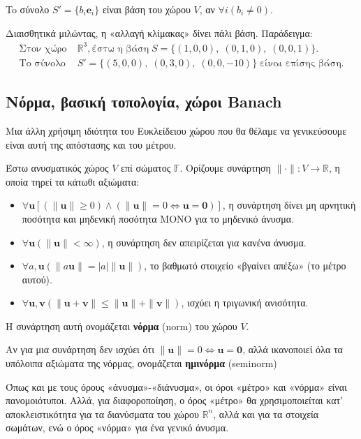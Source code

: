 \documentclass[main.tex]{subfiles}
\begin{document}
	\begin{corollary}
		To σύνολο ${S' = \{b_i\boldsymbol{e}_i\}}$ είναι βάση του χώρου $V$, αν ${\forall i(b_i \neq 0)}$.
	\end{corollary}
	Διαισθητικά μιλώντας, η «αλλαγή κλίμακας» δίνει πάλι βάση. Παράδειγμα:
	\begin{align*}
		\text{Στον χώρο}\;&\mathbb{R}^3, \text{έστω η βάση} \; S = \{(1,0,0),\; (0,1,0),\; (0,0,1)\}. \\
		\text{To σύνολο}\; &S'=\{(5, 0, 0),\;(0,3,0),\;(0,0,-10)\} \; \text{είναι επίσης βάση.}
	\end{align*}
	\newpage
	\subsection{Νόρμα, βασική τοπολογία, χώροι Banach}
	
	Μια άλλη χρήσιμη ιδιότητα του Ευκλείδειου χώρου που θα θέλαμε να γενικεύσουμε είναι αυτή της απόστασης και του μέτρου.
	
	\begin{definition}
		Έστω ανυσματικός χώρος $V$ επί σώματος $\mathbb{F}$. Ορίζουμε συνάρτηση $\|\cdot\|: V \rightarrow \mathbb{R}$, η οποία τηρεί τα κάτωθι αξιώματα:
		\begin{itemize}
			\item $\forall \boldsymbol{u}[(\|\boldsymbol{u}\| \geq 0)\wedge(\|\boldsymbol{u}\| = 0 \Leftrightarrow \boldsymbol{u} = \boldsymbol{0})]$, η συνάρτηση δίνει μη αρνητική ποσότητα και μηδενική ποσότητα ΜΟΝΟ για το μηδενικό άνυσμα.
			\item $\forall \boldsymbol{u}(\|\boldsymbol{u}\| < \infty)$, η συνάρτηση δεν απειρίζεται για κανένα άνυσμα. 
			\item $\forall a,\boldsymbol{u}(\|a\boldsymbol{u}\| = |a|\|\boldsymbol{u}\|)$, το βαθμωτό στοιχείο «βγαίνει απέξω» (το μέτρο αυτού).
			\item $\forall \boldsymbol{u},\boldsymbol{v}(\|\boldsymbol{u} + \boldsymbol{v}\| \leq \|\boldsymbol{u}\| + \|\boldsymbol{v}\|)$, ισχύει η τριγωνική ανισότητα.
		\end{itemize}
		Η συνάρτηση αυτή ονομάζεται \textbf{νόρμα} (norm) του χώρου $V$.
	\end{definition}
	Αν για μια συνάρτηση δεν ισχύει ότι $\|\boldsymbol{u}\| = 0 \Leftrightarrow \boldsymbol{u} = \boldsymbol{0}$, αλλά ικανοποιεί όλα τα υπόλοιπα αξιώματα της νόρμας, ονομάζεται \textbf{ημινόρμα} (seminorm)
	\begin{remark}
		Όπως και με τους όρους «άνυσμα»-«διάνυσμα», οι όροι «μέτρο» και «νόρμα» είναι πανομοιότυποι. Αλλά, για διαφοροποίηση, ο όρος «μέτρο» θα χρησιμοποιείται κατ' αποκλειστικότητα για τα διανύσματα του χώρου $\mathbb{R}^n$, αλλά και για τα στοιχεία σωμάτων, ενώ ο όρος «νόρμα» για ένα γενικό άνυσμα.
	\end{remark}
\end{document}
